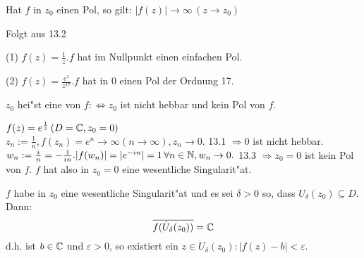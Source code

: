 \documentclass[a4paper,twoside,DIV15,BCOR12mm]{scrbook}
\begin{document}
\begin{satz}
Hat $f$ in $z_0$ einen Pol, so gilt: $|f(z)| \rightarrow \infty \, (z \rightarrow z_0)$
\end{satz}

\begin{beweis}
Folgt aus 13.2
\end{beweis}

\begin{beispiele}
\begin{liste}
\item[(1)] $f(z) = \frac1z. f$ hat im Nullpunkt einen einfachen Pol.
\item[(2)] $f(z) = \frac{e^z}{z^{17}}. f$ hat in $0$ einen Pol der Ordnung 17.
\end{liste}
\end{beispiele}

\begin{definition}
$z_0$ hei"st eine  von $f :\Leftrightarrow z_0$ ist nicht hebbar und kein Pol von $f$.
\end{definition}

\begin{beispiel}
$f(z) = e^{\frac1z} \, (D = \mathbb{C}, z_0=0)$\\
$z_n := \frac1n, f(z_n) = e^n \rightarrow \infty (n \rightarrow \infty), z_n \rightarrow 0.$ 13.1 $\Rightarrow 0$ ist nicht hebbar.\\
$w_n := \frac{i}n = - \frac1{in}. |f(w_n)| = | e^{-in} | = 1 \, \forall n \in \mathbb{N}, w_n \rightarrow 0.$ 13.3 $\Rightarrow z_0 = 0$ ist kein Pol von $f$. $f$ hat also in $z_0 = 0$ eine wesentliche Singularit"at.
\end{beispiel}

\begin{satz}
$f$ habe in $z_0$ eine wesentliche Singularit"at und es sei $\delta > 0$ so, dass $U_{\delta}(z_0) \subseteq D$. Dann:
\[
\overline{f(\dot{U}_{\delta}(z_0))} = \mathbb{C}
\]
d.h. ist $b \in \mathbb{C}$ und $\varepsilon > 0$, so existiert ein $z \in \dot{U}_{\delta}(z_0): |f(z) - b| < \varepsilon$.
\end{satz}
\end{document}
